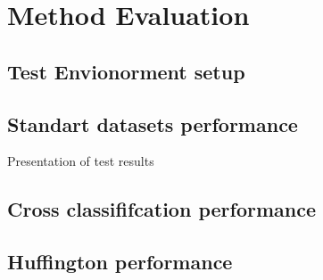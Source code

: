 \chapter{Method Evaluation}

\section{ Test Envionorment setup }

\section{ Standart datasets performance}
Presentation of test results

%

\section{ Cross classififcation performance}

\section{ Huffington performance }

